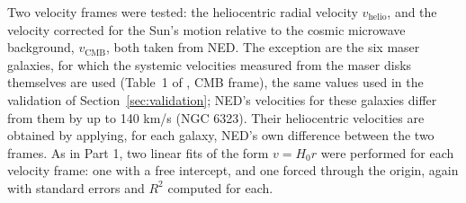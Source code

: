 \documentclass[11pt]{article}
\begin{document}
Two velocity frames were tested: the heliocentric radial velocity $v_{\text{helio}}$, and the velocity corrected for the Sun's motion relative to the cosmic microwave background, $v_{\text{CMB}}$, both taken from NED. The exception are the six maser galaxies, for which the systemic velocities measured from the maser disks themselves are used (Table~1 of \citealt{pesce2020}, CMB frame), the same values used in the validation of Section~\ref{sec:validation}; NED's velocities for these galaxies differ from them by up to 140 km/s (NGC 6323). Their heliocentric velocities are obtained by applying, for each galaxy, NED's own difference between the two frames. As in Part 1, two linear fits of the form $v = H_0 r$ were performed for each velocity frame: one with a free intercept, and one forced through the origin, again with standard errors and $R^2$ computed for each.
\end{document}
